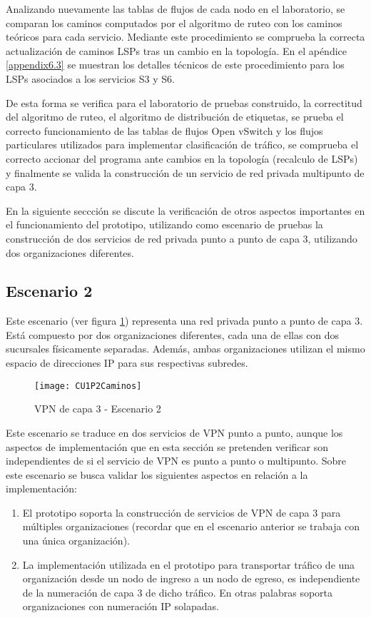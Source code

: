Analizando nuevamente las tablas de flujos de cada nodo en el laboratorio, se comparan los caminos computados por el algoritmo de ruteo con los caminos te\'oricos para cada servicio. Mediante este procedimiento se comprueba la correcta actualizaci\'on de caminos LSPs tras un cambio en la topolog\'ia. En el ap\'endice \ref{appendix6.3} se muestran los detalles t\'ecnicos de este procedimiento para los LSPs asociados a los servicios S3 y S6.
 
De esta forma se verifica para el laboratorio de pruebas construido, la correctitud del algoritmo de ruteo, el algoritmo de distribución de etiquetas, se prueba el correcto funcionamiento de las tablas de flujos Open vSwitch y los flujos particulares utilizados para implementar clasificación de tr\'afico, se comprueba el correcto accionar del programa ante cambios en la topolog\'ia (recalculo de LSPs) y finalmente se valida la construcción de un servicio de red privada multipunto de capa 3.

En la siguiente seccci\'on se discute la verificación de otros aspectos importantes en el funcionamiento del prototipo, utilizando como escenario de pruebas la construcci\'on de dos servicios de red privada punto a punto de capa 3, utilizando dos organizaciones diferentes.   

\subsection{Escenario 2}

Este escenario (ver figura \ref{fig:CUP2}) representa una red privada punto a punto de capa 3. Est\'a compuesto por dos organizaciones diferentes, cada una de ellas con dos sucursales f\'isicamente separadas. Adem\'as, ambas organizaciones utilizan el mismo espacio de direcciones IP para sus respectivas subredes.

\begin{figure}[h!] 
\centering    
\texttt{[image: CU1P2Caminos]}
\caption[VPN de capa 3 - Escenario 2]{VPN de capa 3 - Escenario 2}
\label{fig:CUP2}
\end{figure}

Este escenario se traduce en dos servicios de VPN punto a punto, aunque los aspectos de implementaci\'on que en esta secci\'on se pretenden verificar son independientes de si el servicio de VPN es punto a punto o multipunto. Sobre este escenario se busca validar los siguientes aspectos en relaci\'on a la implementaci\'on:

\begin{enumerate}
\item El prototipo soporta la construcci\'on de servicios de VPN de capa 3 para múltiples organizaciones (recordar que en el escenario anterior se trabaja con una \'unica organización).

\item La implementaci\'on utilizada en el prototipo para transportar tr\'afico de una organización desde un nodo de ingreso a un nodo de egreso, es independiente de la numeraci\'on de capa 3 de dicho tr\'afico. En otras palabras soporta organizaciones con numeraci\'on IP solapadas.
\end{enumerate}

